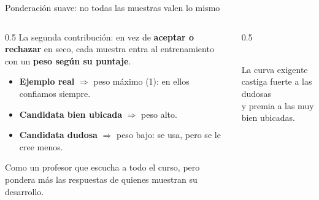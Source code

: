\begin{frame}{Ponderación suave: no todas las muestras valen lo mismo}
\begin{columns}[T]

\begin{column}{0.5\textwidth}
\small
La segunda contribución: en vez de \textbf{aceptar o rechazar} en seco, cada muestra entra al entrenamiento con un \textbf{peso según su puntaje}.

\vspace{0.4em}
\begin{itemize}\setlength\itemsep{2pt}
  \item \textbf{Ejemplo real} $\Rightarrow$ peso máximo (1): en ellos confiamos siempre.
  \item \textbf{Candidata bien ubicada} $\Rightarrow$ peso alto.
  \item \textbf{Candidata dudosa} $\Rightarrow$ peso bajo: se usa, pero \alert{se le cree menos}.
\end{itemize}

\vspace{0.4em}
\begin{insight}
\scriptsize
Como un profesor que escucha a todo el curso, pero pondera más las respuestas de quienes muestran su desarrollo.
\end{insight}
\end{column}

\begin{column}{0.5\textwidth}
\centering
{}\\[4pt]
{\scriptsize La curva exigente castiga fuerte a las dudosas\\y premia a las muy bien ubicadas.}
\end{column}

\end{columns}

\end{frame}

